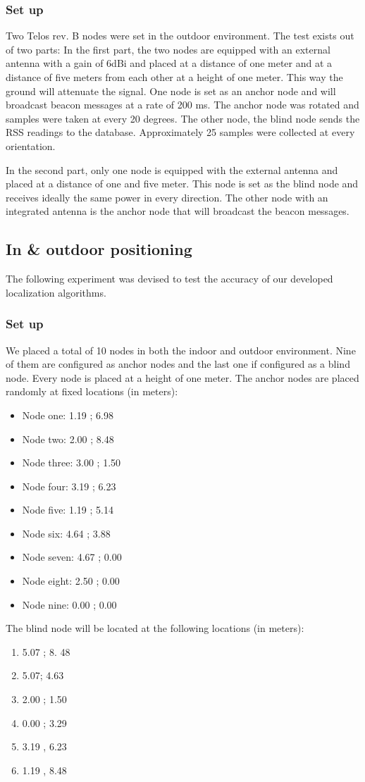 \subsubsection{Set up}
Two Telos rev. B nodes were set in the outdoor environment. 
The test exists out of two parts:
In the first part, the two nodes are equipped with an external antenna with a gain of 6dBi and placed at a distance of one meter and at a distance of five meters from each other at a height of one meter. This way the ground will attenuate the signal. One node is set as an anchor node and will broadcast beacon messages at a rate of 200 ms. The anchor node was rotated and samples were taken at every 20 degrees. The other node, the blind node sends the RSS readings to the database. Approximately 25 samples were collected at every orientation.

In the second part, only one node is equipped with the external antenna and placed at a distance of one and five meter. This node is set as the blind node and receives ideally the same power in every direction. The other node with an integrated antenna is the anchor node that will broadcast the beacon messages. 

\subsection{In \& outdoor positioning}
The following experiment was devised to test the accuracy of our developed localization algorithms.

\subsubsection{Set up}
We placed a total of 10 nodes in both the indoor and outdoor environment. Nine of them are configured as anchor nodes and the last one if configured as a blind node. Every node is placed at a height of one meter.
The anchor nodes are placed randomly at fixed locations (in meters):
\begin{itemize}
	\item Node one: 1.19  ; 6.98
	\item Node two: 2.00 ; 8.48
	\item Node three: 3.00 ; 1.50
	\item Node four: 3.19 ; 6.23
	\item Node five: 1.19 ; 5.14
	\item Node six: 4.64 ; 3.88
	\item Node seven: 4.67 ; 0.00
	\item Node eight: 2.50 ; 0.00
	\item Node nine: 0.00 ; 0.00
\end{itemize}
The blind node will be located at the following locations (in meters):
\begin{enumerate}
	\item 5.07 ; 8. 48
	\item 5.07; 4.63
	\item 2.00 ; 1.50
	\item 0.00 ; 3.29
	\item 3.19 , 6.23
	\item 1.19 , 8.48
\end{enumerate}



